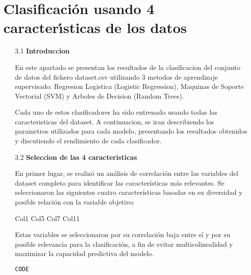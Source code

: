 \documentclass{article}
\begin{document}

\newpage

\section[3]{Clasificaci\'on usando 4 caracter\'{\i}sticas de los datos}

\begin{itemize}

\item[3.1]  {\bf Introduccion}

En este apartado se presentan los resultados de la clasificacion del conjunto de datos del fichero dataset.csv utilizando 3 metodos de aprendizaje supervisado: Regresion Logistica (Logistic Regression), Maquinas de Soporte Vectorial (SVM) y Arboles de Decision (Random Trees).

Cada uno de estos clasificadores ha sido entrenado usando todas las caracteristicas del dataset. A continuacion, se iran describiendo los parametros utilizados para cada modelo, presentando los resultados obtenidos y discutiendo el rendimiento de cada clasificador.

\end{itemize}

\bigskip

\begin{itemize}

\item[3.2]  {\bf Seleccion de las 4 caracteristicas}

En primer lugar, se realizó un análisis de correlación entre las variables del dataset completo para identificar las características más relevantes. Se seleccionaron las siguientes cuatro características basadas en su diversidad y posible relación con la variable objetivo:

Col1
Col5
Col7
Col11

Estas variables se seleccionaron por su correlación baja entre sí y por su posible relevancia para la clasificación, a fin de evitar multicolinealidad y maximizar la capacidad predictiva del modelo.

\begin{tcolorbox}[width=14cm]
\begin{scriptsize}
\begin{verbatim}
CODE
\end{verbatim}
\end{scriptsize}
\end{tcolorbox}

\end{itemize}
\end{document}
